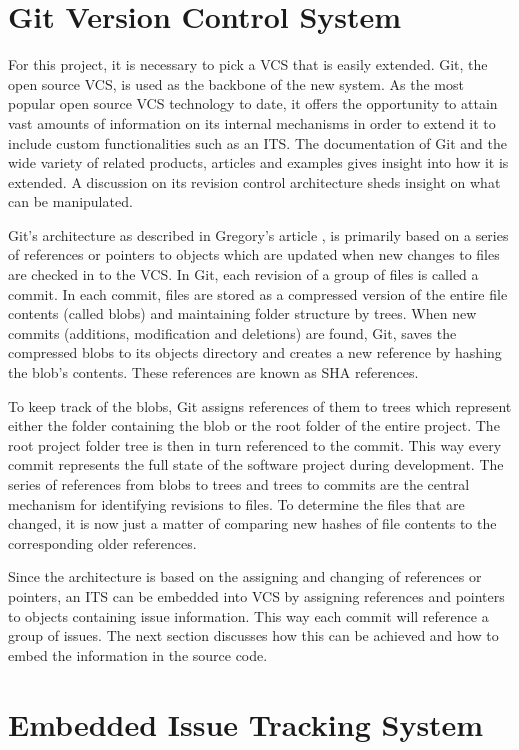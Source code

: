 \documentclass{mproj}
\begin{document}
\section{Git Version Control System}

For this project, it is necessary to pick a VCS that is easily extended. Git, the open source VCS, is used as the backbone of the new system. As the most popular open source VCS technology to date, it offers the opportunity to attain vast amounts of information on its internal mechanisms in order to extend it to include custom functionalities such as an ITS. The documentation of Git and the wide variety of related products, articles and examples gives insight into how it is extended. A discussion on its revision control architecture sheds insight on what can be manipulated.

Git’s architecture as described in Gregory's article \cite{BehindGit}, is primarily based on a series of references or pointers to objects which are updated when new changes to files are checked in to the VCS. In Git, each revision of a group of files is called a commit. In each commit, files are stored as a compressed version of the entire file contents (called blobs) and maintaining folder structure by trees. When new commits (additions, modification and deletions) are found, Git, saves the compressed blobs to its objects directory and creates a new reference by hashing the blob’s contents. These references are known as SHA references.

To keep track of the blobs, Git assigns references of them to trees which represent either the folder containing the blob or the root folder of the entire project. The root project folder tree is then in turn referenced to the commit. This way every commit represents the full state of the software project during development. The series of references from blobs to trees and trees to commits are the central mechanism for identifying revisions to files. To determine the files that are changed, it is now just a matter of comparing new hashes of file contents to the corresponding older references.

Since the architecture is based on the assigning and changing of references or pointers, an ITS can be embedded into VCS by assigning references and pointers to objects containing issue information. This way each commit will reference a group of issues. The next section discusses how this can be achieved and how to embed the information in the source code.


\section{Embedded Issue Tracking System}
\end{document}
